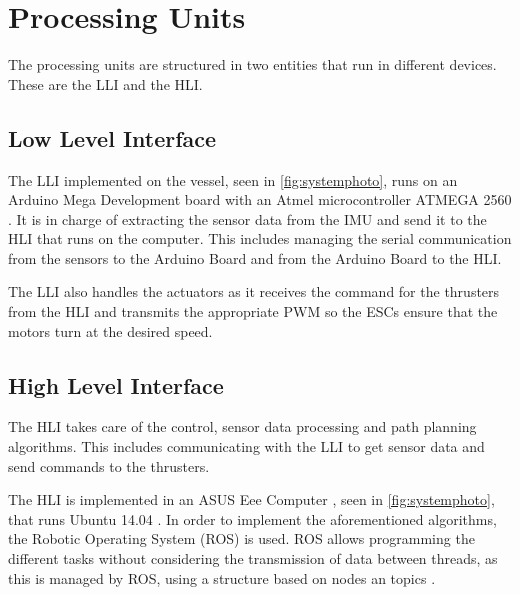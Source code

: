 \section{Processing Units}\label{sec:ControlComputation}
The processing units are structured in two entities that run in different devices. These are the LLI and the HLI.

\subsection{Low Level Interface} 
The LLI implemented on the vessel, seen in \autoref{fig:systemphoto}, runs on an Arduino Mega Development board with an Atmel microcontroller ATMEGA 2560 \cite{Mega2560}. It is in charge of extracting the sensor data from the IMU and send it to the HLI that runs on the computer. This includes managing the serial communication from the sensors to the Arduino Board and from the Arduino Board to the HLI. 

The LLI also handles the actuators as it receives the command for the thrusters from the HLI and transmits the appropriate PWM so the ESCs ensure that the motors turn at the desired speed.

\subsection{High Level Interface}
The HLI takes care of the control, sensor data processing and path planning algorithms. This includes communicating with the LLI to get sensor data and send commands to the thrusters. 

The HLI is implemented in an ASUS Eee Computer \cite{asus}, seen in \autoref{fig:systemphoto}, that runs Ubuntu 14.04 \cite{ubuntu}. In order to implement the aforementioned algorithms, the Robotic Operating System (ROS) is used. ROS allows programming the different tasks without considering the transmission of data between threads, as this is managed by ROS, using a structure based on nodes an topics \cite{ROS}.